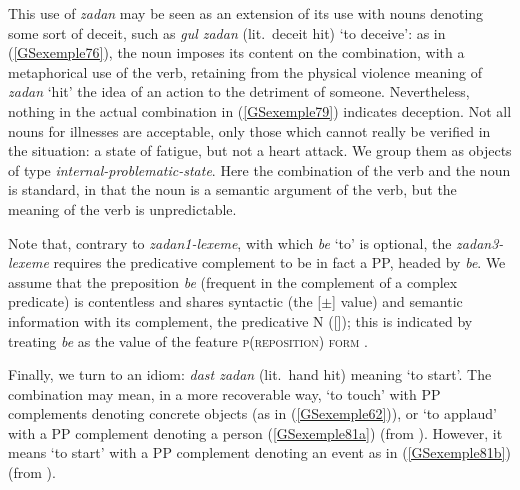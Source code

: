 \z

\noindent
This use of \emph{zadan} may be seen as an extension of its use with nouns denoting some sort of
deceit, such as \emph{gul zadan} (lit.\ deceit hit) `to deceive’: as in (\ref{GSexemple76}), the
noun imposes its content on the combination, with a metaphorical use of the verb, retaining from the
physical violence meaning of \emph{zadan} `hit’ the idea of an action to the detriment of
someone. Nevertheless, nothing in the actual combination in (\ref{GSexemple79}) indicates
deception. Not all nouns for illnesses are acceptable, only those which cannot really be verified in
the situation: a state of fatigue, but not a heart attack. We group them as objects of type \emph{internal-problematic-state}. Here the combination of the verb and the noun is standard, in that the noun is a semantic argument of the verb, but the meaning of the verb is unpredictable.

\ea
\label{GSexemple80}%
\z

\noindent
Note that, contrary to \emph{zadan1-lexeme}, with which \emph{be} `to' is optional, the \emph{zadan3-lexeme} requires the predicative complement to be in fact a PP, headed by \emph{be}. We assume that the preposition \emph{be} (frequent in the complement of a complex predicate) is contentless and shares syntactic (the [\prd $\pm$] value) and semantic information with its complement, the predicative N ([\cont {}]); this is indicated by treating \emph{be} as the value of the feature \textsc{p(reposition) form} \citep[Chapter~3]{ps}.  

Finally, we turn to an idiom: \emph{dast zadan} (lit.\ hand hit) meaning `to start'. The combination may mean, in a more recoverable way, `to touch' with PP complements denoting concrete objects (as in (\ref{GSexemple62})), or `to applaud' with a PP complement denoting a person (\ref{GSexemple81a}) (from \citealt[45]{pollet2012grammaire}). However, it means `to start' with a PP complement denoting an event as in (\ref{GSexemple81b}) (from \citealt[185]{pollet2012grammaire}).

